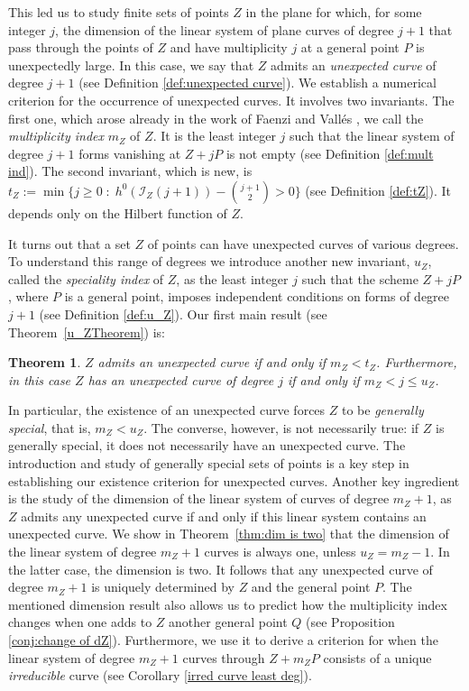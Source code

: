 \documentclass[12pt]{amsart}
\numberwithin{equation}{section}
\newtheorem{theorem}{Theorem}[section]
\theoremstyle{definition}
\begin{document}
This led us to study finite sets of points 
$Z$ in the plane for which, for some integer $j$, the dimension of the linear system of plane
curves of degree $j+1$ that pass  through the points of $Z$ and have multiplicity $j$ at a general point $P$ is unexpectedly large. In this case, we say that $Z$ admits an \emph{unexpected curve} of degree $j+1$ (see Definition \ref{def:unexpected curve}). We establish a numerical criterion for the occurrence of unexpected curves. It involves two invariants. The first one, which arose already in the work of Faenzi and Vall\'es \cite{FV2}, we call the \emph{multiplicity index}  $m_Z$ of $Z$. It  is the least integer $j$ such that the linear system of degree $j+1$ forms vanishing at $Z + jP$ is not empty (see Definition \ref{def:mult ind}). 
The second invariant, which is new,  is $t_Z := \min \big\{j \ge 0 \; : \; h^0(\mathcal I_Z(j+1)) - \binom{j+1}{2} > 0 \big\}$ (see Definition \ref{def:tZ}). It depends only on the Hilbert function of $Z$.

It turns out that a set $Z$ of points can have unexpected curves of various degrees. To understand this range of degrees we introduce  another new invariant, $u_Z$, called the \emph{speciality index} of $Z$,  as the least integer $j$ such that the scheme $Z + j P$, where $P$ is a general point, imposes independent conditions on forms of degree $j+1$ (see Definition \ref{def:u_Z}). Our first main result (see Theorem~\ref{u_ZTheorem}) is: 

\begin{theorem}\label{mainThm1} $Z$ admits an unexpected curve if and only if $m_Z < t_Z$. Furthermore, in this case $Z$ has an unexpected curve of degree $j$ if and only if $m_Z < j \le u_Z$. 
\end{theorem}

In particular, the existence of an unexpected curve forces $Z$ to be \emph{generally special}, that is,  $m_Z < u_Z$. The converse, however, is not necessarily true: if $Z$ is generally special, it does not necessarily have an unexpected curve.
The introduction and study of generally special sets of points is a key step in establishing  our existence criterion for unexpected curves. Another key ingredient is the study of the dimension of the linear system of curves of degree $m_Z + 1$,  as $Z$ admits any unexpected curve if and only if this linear system contains an unexpected curve.  We show in Theorem~\ref{thm:dim is two} that the dimension of the linear system of degree $m_Z + 1$ curves  is always one, unless $u_Z = m_Z -1$. In the latter case, the dimension is two. It follows that any unexpected curve of degree $m_Z + 1$ is uniquely determined by $Z$ and the general point $P$. The mentioned dimension result also allows us to predict how the multiplicity index changes when one adds to $Z$ another general point $Q$ (see Proposition \ref{conj:change of dZ}). Furthermore, we use it to derive a criterion for when the linear system of degree $m_Z + 1$ curves through $Z + m_Z P$ consists of a unique \emph{irreducible} curve (see Corollary \ref{irred curve least deg}). 
\end{document}
